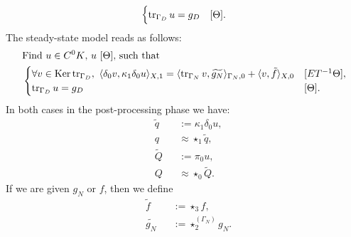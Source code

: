 \begin{formulation}
\begin{equation}
\begin{split}
\begin{cases}
        \mathop{\rm tr}\nolimits_{\Gamma_D} u = g_D & [\Theta].
      \end{cases}
    \end{split}
  \end{equation}
  The steady-state model reads as follows:
  \begin{equation}
    \begin{split}
      & \text{Find $u \in C^0 K$, $u\ [\Theta]$, such that} \\
      &
      \begin{cases}
        \forall v \in \mathop{\rm Ker}\nolimits \mathop{\rm tr}\nolimits_{\Gamma_D},\
          \langle\delta_0 v,\kappa_1 \delta_0 u\rangle_{X, 1}
          = \langle\mathop{\rm tr}\nolimits_{\Gamma_N} v,\widetilde{g_N}\rangle_{\Gamma_N, 0}
          + \langle v,\tilde{f}\rangle_{X, 0}
      & [E T^{-1} \Theta], \\
        \mathop{\rm tr}\nolimits_{\Gamma_D} u = g_D & [\Theta].
      \end{cases}
    \end{split}
  \end{equation}
  In both cases in the post-processing phase we have:
  \begin{subequations}
    \begin{alignat}{2}
      & \tilde{q} && := \kappa_1 \delta_0 u, \\
      & q && \approx \star_1 \tilde{q}, \\
      & \tilde{Q} && := \pi_0 u, \\
      & Q && \approx \star_0 \tilde{Q}.
    \end{alignat}
  \end{subequations}
  If we are given $g_N$ or $f$, then we define
  \begin{subequations}
    \begin{alignat}{2}
      & \tilde{f} && := \star_3 f, \\
      & \tilde{g_N} && := \star_2^{(\Gamma_N)} g_N.
    \end{alignat}
  \end{subequations}
\end{formulation}
